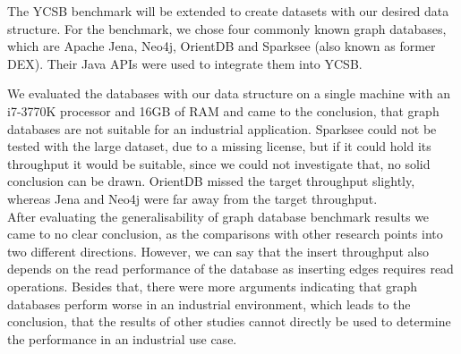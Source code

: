 The YCSB benchmark will be extended to create datasets with our desired data structure.
For the benchmark,
we chose four commonly known graph databases, which are Apache Jena, Neo4j, OrientDB and Sparksee (also known as former DEX).
Their Java APIs were used to integrate them into YCSB.

We evaluated the databases with our data structure on a single machine with an i7-3770K processor and 16GB of RAM and came to the conclusion,
that graph databases are not suitable for an industrial application.
Sparksee could not be tested with the large dataset,
due to a missing license,
but if it could hold its throughput it would be suitable,
since we could not investigate that,
no solid conclusion can be drawn.
OrientDB missed the target throughput slightly,
whereas Jena and Neo4j were far away from the target throughput.\\
After evaluating the generalisability of graph database benchmark results we came to no clear conclusion,
as the comparisons with other research points into two different directions.
However,
we can say that the insert throughput also depends on the read performance of the database as inserting edges requires read operations.
Besides that,
there were more arguments indicating that graph databases perform worse in an industrial environment,
which leads to the conclusion,
that the results of other studies cannot directly be used to determine the performance in an industrial use case.

\cleardoublepage
